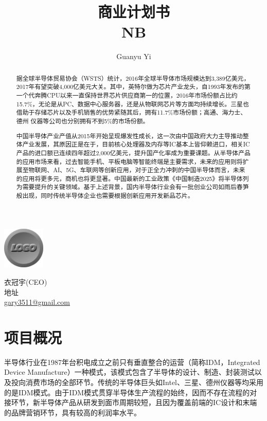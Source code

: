 \documentclass[a4paper,11pt]{article}
\title{商业计划书\\NB}
\author{Guanyu Yi}
\begin{document}
\begin{titlepage}
  \centering
  \maketitle
  \thispagestyle{empty}   %
  \includegraphics[width=2cm]{images/logo.png}
  \vfill
  {\raggedright
    衣冠宇(CEO)\\
    地址\\
    \href{mailto:gary3511@gmail.com}{gary3511@gmail.com}\\
  }
\end{titlepage}

\renewcommand{\abstractname}{摘要}
\begin{abstract}
  据全球半导体贸易协会（WSTS）统计，2016年全球半导体市场规模达到3,389亿美元，2017年有望突破4,000亿美元大关。其中，英特尔做为芯片产业龙头，自1993年发布的第一个代奔腾CPU以来一直保持世界芯片供应商第一的位置，2016年市场份额占比约15.7\%，无论是从PC、数据中心服务器，还是从物联网芯片等方面均持续增长。三星也借助于存储芯片以及手机销售的优势紧随其后，拥有11.7\%市场份额；高通、海力士、德州 仪器等公司也分别拥有不到5\%的市场份额。
  
  中国半导体产业产值从2015年开始呈现爆发性成长，这一次由中国政府大力主导推动整体产业发展，其原因正是在于，目前核心处理器及内存等IC基本上皆仰赖进口，相关IC产品的进口额已连续四年超过2,000亿美元，提升国产化率成为重要课题。从半导体产品的应用市场来看，过去智能手机、平板电脑等智能终端是主要需求，未来的应用则将扩展至物联网、AI、5G、车联网等创新应用，对于正全力冲刺的中国半导体而言，未来的应用将更多元，商机也将更显著。中国最新的工业政策《中国制造2025》将半导体列为需要提升的关键领域。基于上述背景，国内半导体行业会有一批创业公司如雨后春笋般出现，同时传统半导体企业也需要根据创新应用开发新品芯片。
\end{abstract}

\pagebreak
\tableofcontents
\pagebreak

\section{项目概况}
半导体行业在1987年台积电成立之前只有垂直整合的运营（简称IDM，Integrated Device Manufacture）一种模式，该模式包含了半导体的设计、制造、封装测试以及投向消费市场的全部环节。传统的半导体巨头如Intel、三星、德州仪器等均采用的是IDM模式。由于IDM模式贯穿半导体生产流程的始终，因而不存在流程的对接环节，新半导体产品从研发到面市周期较短，且因为覆盖前端的IC设计和末端的品牌营销环节，具有较高的利润率水平。
\end{document}
